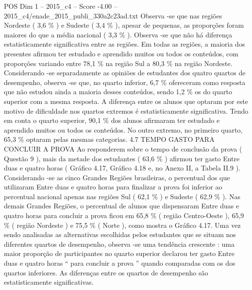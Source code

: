 \begin{textsample}{POS Dim 1 – 2015\_c4 – Score -4.00 – 2015\_c4/enade\_2015\_publi\_330a2c23ad.txt}
Observa -se que nas regiões Nordeste ( 3,6 \% ) e Sudeste ( 3,4 \% ), apesar de pequenas, as proporções foram maiores do que a média nacional ( 3,3 \% ).
Observa -se que não há diferença estatisticamente significativa entre as regiões.
Em todas as regiões, a maioria dos presentes afirmou ter estudado e aprendido muitos ou todos os conteúdos, com proporções variando entre 78,1 \% na região Sul a 80,3 \% na região Nordeste.
Considerando -se separadamente as opiniões de estudantes dos quatro quartos de desempenho, observa -se que, no quarto inferior, 6,7 \% ofereceram como resposta que não estudou ainda a maioria desses conteúdos, sendo 1,2 \% os do quarto superior com a mesma resposta.
A diferença entre os alunos que optaram por este motivo de dificuldade nos quartos extremos é estatisticamente significativa.
Tendo em conta o quarto superior, 90,1 \% dos alunos afirmaram ter estudado e aprendido muitos ou todos os conteúdos.
No outro extremo, no primeiro quarto, 65,3 \% optaram pelas mesmas categorias. 4.7 TEMPO GASTO PARA CONCLUIR A PROVA Ao responderem sobre o tempo de conclusão da prova ( Questão 9 ), mais da metade dos estudantes ( 63,6 \% ) afirmou ter gasto Entre duas e quatro horas ( Gráfico 4.17, Gráfico 4.18 e, no Anexo II, a Tabela II.9 ).
Considerando -se as cinco Grandes Regiões brasileiras, o percentual dos que utilizaram Entre duas e quatro horas para finalizar a prova foi inferior ao percentual nacional apenas nas regiões Sul ( 62,1 \% ) e Sudeste ( 62,9 \% ).
Nas demais Grandes Regiões, o percentual de alunos que dispensaram Entre duas e quatro horas para concluir a prova ficou em 65,8 \% ( região Centro-Oeste ), 65,9 \% ( região Nordeste ) e 75,5 \% ( Norte ), como mostra o Gráfico 4.17.
Uma vez sendo analisadas as alternativas escolhidas pelos estudantes que se situam nos diferentes quartos de desempenho, observa -se uma tendência crescente : uma maior proporção de participantes no quarto superior declarou ter gasto Entre duas e quatro horas “ para concluir a prova ” quando comparadas com os dos quartos inferiores.
As diferenças entre os quartos de desempenho são estatisticamente significativas.

\end{textsample}
